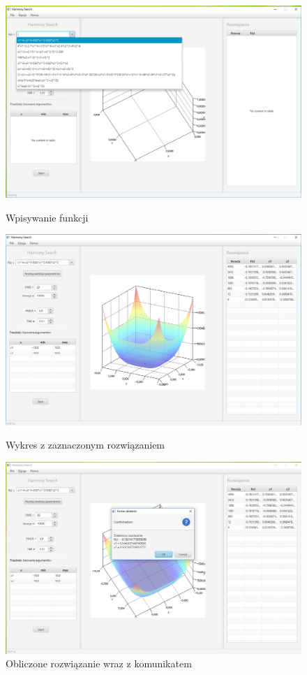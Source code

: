 \documentclass[10pt, a4paper]{article}
\begin{document}
\begin{figure}[h] 
	\begin{minipage}[b]{.5\linewidth}
		\centering
		\includegraphics[width=.8\linewidth]{images/1.PNG} 
		\caption{Wpisywanie funkcji}
		\label{fig:1}
	\end{minipage} 
	\begin{minipage}[b]{.5\linewidth}
		\centering
		\includegraphics[width=.8\linewidth]{images/3.PNG} 
		\caption{Wykres z zaznaczonym rozwiązaniem}
		\label{fig:2}
	\end{minipage}
	\newline
	\newline
	\begin{minipage}[b]{1\linewidth}
		\centering
		\includegraphics[width=.9\linewidth]{images/2.PNG} 
		\caption{Obliczone rozwiązanie wraz z komunikatem}
		\label{fig:3}
	\end{minipage}
\end{figure}
\end{document}
